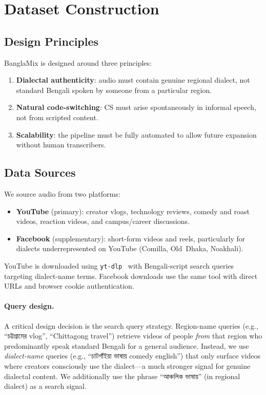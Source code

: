 \section{Dataset Construction}
\label{sec:dataset}

\subsection{Design Principles}

BanglaMix is designed around three principles:
\begin{enumerate}[leftmargin=*, itemsep=2pt]
  \item \textbf{Dialectal authenticity}: audio must contain genuine regional
        dialect, not standard Bengali spoken by someone from a particular region.
  \item \textbf{Natural code-switching}: CS must arise spontaneously in
        informal speech, not from scripted content.
  \item \textbf{Scalability}: the pipeline must be fully automated to allow
        future expansion without human transcribers.
\end{enumerate}

\subsection{Data Sources}

We source audio from two platforms:
\begin{itemize}[leftmargin=*, itemsep=2pt]
  \item \textbf{YouTube} (primary): creator vlogs, technology reviews, comedy
        and roast videos, reaction videos, and campus/career discussions.
  \item \textbf{Facebook} (supplementary): short-form videos and reels,
        particularly for dialects underrepresented on YouTube (Comilla,
        Old~Dhaka, Noakhali).
\end{itemize}

YouTube is downloaded using \texttt{yt-dlp}~\citep{ytdlp} with Bengali-script
search queries targeting dialect-name terms.
Facebook downloads use the same tool with direct URLs and browser cookie
authentication.

\paragraph{Query design.}
A critical design decision is the search query strategy.
Region-name queries (e.g., ``চট্টগ্রামের vlog'', ``Chittagong travel'')
retrieve videos of people \emph{from} that region who predominantly speak
standard Bengali for a general audience.
Instead, we use \emph{dialect-name} queries (e.g., ``চাটগাঁইয়া ভাষায়
comedy english'') that only surface videos where creators consciously use the
dialect---a much stronger signal for genuine dialectal content.
We additionally use the phrase ``আঞ্চলিক ভাষায়'' (in regional dialect) as a
search signal.

